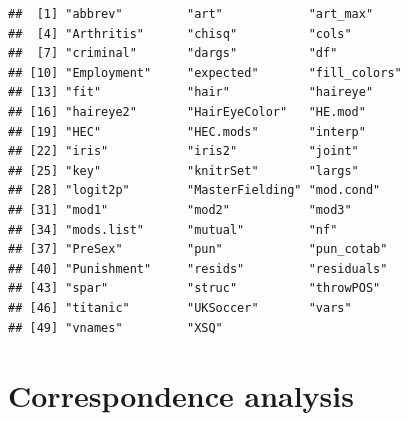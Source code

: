 \documentclass[11pt]{book}
\renewenvironment{knitrout}{\small\renewcommand{\baselinestretch}{.85}}{} %
\begin{document}
\begin{knitrout}\footnotesize
{}\color{fgcolor}\begin{kframe}
\begin{alltt}
\hlopt{$} \hlkwb{<-} \hlstd{(}
\hlopt{$}
\end{alltt}
\begin{verbatim}
##  [1] "abbrev"         "art"            "art_max"       
##  [4] "Arthritis"      "chisq"          "cols"          
##  [7] "criminal"       "dargs"          "df"            
## [10] "Employment"     "expected"       "fill_colors"   
## [13] "fit"            "hair"           "haireye"       
## [16] "haireye2"       "HairEyeColor"   "HE.mod"        
## [19] "HEC"            "HEC.mods"       "interp"        
## [22] "iris"           "iris2"          "joint"         
## [25] "key"            "knitrSet"       "largs"         
## [28] "logit2p"        "MasterFielding" "mod.cond"      
## [31] "mod1"           "mod2"           "mod3"          
## [34] "mods.list"      "mutual"         "nf"            
## [37] "PreSex"         "pun"            "pun_cotab"     
## [40] "Punishment"     "resids"         "residuals"     
## [43] "spar"           "struc"          "throwPOS"      
## [46] "titanic"        "UKSoccer"       "vars"          
## [49] "vnames"         "XSQ"
\end{verbatim}
\begin{alltt}
\hlstd{(}\hlopt{$}\hlstd{ch05[}\hlopt{$}\hlstd{(}\hlstd{)\{}\hlopt{!}\hlstd{(}\hlstd{(n))\})])}
\end{alltt}
\end{kframe}
\end{knitrout}





\chapter{Correspondence analysis}\label{ch:corresp}

\end{document}
